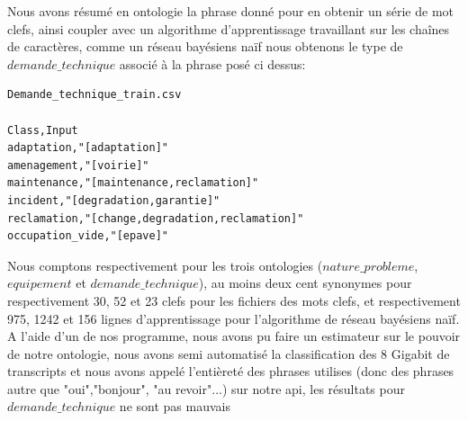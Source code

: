Nous avons résumé en ontologie la phrase donné pour en obtenir un série de mot clefs, ainsi coupler avec un algorithme d'apprentissage travaillant sur les chaînes de caractères, comme un réseau bayésiens naïf nous obtenons le type de $demande\_technique$ associé à la phrase posé ci dessus:

\begin{lstlisting}
Demande_technique_train.csv

Class,Input
adaptation,"[adaptation]"
amenagement,"[voirie]"
maintenance,"[maintenance,reclamation]"
incident,"[degradation,garantie]"
reclamation,"[change,degradation,reclamation]"
occupation_vide,"[epave]"
\end{lstlisting}

Nous comptons respectivement pour les trois ontologies ($nature\_probleme$, $equipement$ et $demande\_technique$), au moins deux cent synonymes pour respectivement 30, 52 et 23 clefs pour les fichiers des mots clefs, et respectivement 975, 1242 et 156 lignes d'apprentissage pour l'algorithme de réseau bayésiens naïf.\\
A l'aide d'un de nos programme, nous avons pu faire un estimateur sur le pouvoir de notre ontologie, nous avons semi automatisé la classification des 8 Gigabit de transcripts et nous avons appelé l'entièreté des phrases utilises (donc des phrases autre que "oui","bonjour", "au revoir"...) sur notre api, les résultats pour $demande\_technique$ ne sont pas mauvais

